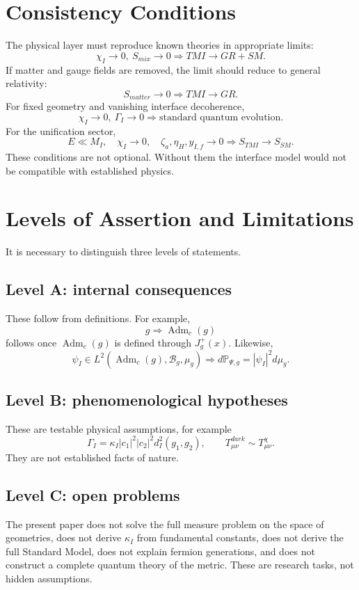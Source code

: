 \documentclass[12pt,a4paper]{article}
\DeclareMathOperator{\Adm}{Adm}
\newcommand{\Prob}{\mathbb P}
\begin{document}
\section{Consistency Conditions}
The physical layer must reproduce known theories in appropriate limits:
\[
\boxed{\chi_I\to0,\ S_{mix}\to0\Rightarrow TMI\to GR+SM.}
\]
If matter and gauge fields are removed, the limit should reduce to general relativity:
\[
\boxed{S_{matter}\to0\Rightarrow TMI\to GR.}
\]
For fixed geometry and vanishing interface decoherence,
\[
\boxed{\chi_I\to0,\ \Gamma_I\to0\Rightarrow \text{standard quantum evolution}.}
\]
For the unification sector,
\[
\boxed{E\ll M_I,
\quad \chi_I\to0,
\quad \zeta_a,\eta_H,y_{I,f}\to0
\Rightarrow S_{TMI}\to S_{SM}.}
\]
These conditions are not optional. Without them the interface model would not be compatible with established physics.

\section{Levels of Assertion and Limitations}
It is necessary to distinguish three levels of statements.

\subsection*{Level A: internal consequences}
These follow from definitions. For example,
\[
g\Rightarrow\Adm_c(g)
\]
follows once $\Adm_c(g)$ is defined through $J_g^+(x)$. Likewise,
\[
\psi_I\in L^2(\Adm_c(g),\mathcal B_g,\mu_g)
\Rightarrow
 d\Prob_{\Psi,g}=|\psi_I|^2d\mu_g.
\]

\subsection*{Level B: phenomenological hypotheses}
These are testable physical assumptions, for example
\[
\Gamma_I=\kappa_I|c_1|^2|c_2|^2d_I^2(g_1,g_2),
\qquad
T_{\mu\nu}^{dark}\sim T_{\mu\nu}^{\chi}.
\]
They are not established facts of nature.

\subsection*{Level C: open problems}
The present paper does not solve the full measure problem on the space of geometries, does not derive $\kappa_I$ from fundamental constants, does not derive the full Standard Model, does not explain fermion generations, and does not construct a complete quantum theory of the metric. These are research tasks, not hidden assumptions.
\end{document}
